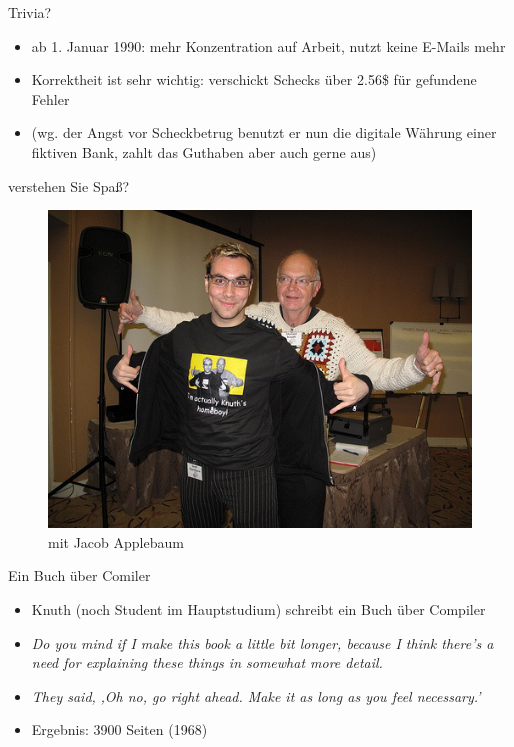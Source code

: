 \begin{frame}{Trivia?}

\begin{itemize}
\itemsep1pt\parskip0pt
\item
  ab 1. Januar 1990: mehr Konzentration auf Arbeit, nutzt keine E-Mails
  mehr
\item
  Korrektheit ist sehr wichtig: verschickt Schecks über 2.56\$ für
  gefundene Fehler
\item
  (wg. der Angst vor Scheckbetrug benutzt er nun die digitale Währung
  einer fiktiven Bank, zahlt das Guthaben aber auch gerne aus)
\end{itemize}

\end{frame}

\begin{frame}{verstehen Sie Spaß?}

\begin{figure}[htbp]
\centering
\includegraphics[width=\textwidth*0.8,height=\textheight*0.8,keepaspectratio]{../img/knuth-applebaum.jpg}
\caption{mit Jacob Applebaum}
\end{figure}

\end{frame}

\begin{frame}{Ein Buch über Comiler}

\begin{itemize}
\itemsep1pt\parskip0pt
\item
    Knuth (noch Student im Hauptstudium) schreibt ein Buch über Compiler
\item
    \textit{Do you mind if I make this book a little bit longer, because I think there's a need for explaining these things in somewhat more detail.}
\item
    \textit{They said, ‚Oh no, go right ahead. Make it as long as you feel necessary.'}
\item
  Ergebnis: 3900 Seiten (1968)
\end{itemize}

\end{frame}

